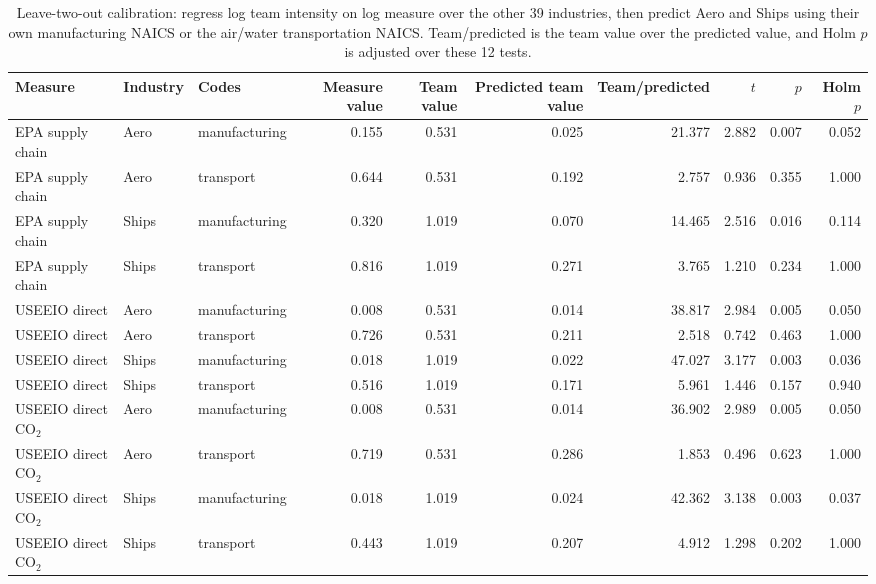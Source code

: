 \begin{table}[H]
\centering\small
\caption{Leave-two-out calibration: regress log team intensity on log measure over the other 39 industries, then predict Aero and Ships using their own manufacturing NAICS or the air/water transportation NAICS. Team/predicted is the team value over the predicted value, and Holm $p$ is adjusted over these 12 tests.}
\label{tab:m4_calibration}
\begin{adjustbox}{max width=\linewidth}
\begin{tabular}{lllrrrrrrr}
\toprule
Measure & Industry & Codes & Measure value & Team value & Predicted team value & Team/predicted & $t$ & $p$ & Holm $p$ \\
\midrule
EPA supply chain & Aero & manufacturing & 0.155 & 0.531 & 0.025 & 21.377 & 2.882 & 0.007 & 0.052 \\
EPA supply chain & Aero & transport & 0.644 & 0.531 & 0.192 & 2.757 & 0.936 & 0.355 & 1.000 \\
EPA supply chain & Ships & manufacturing & 0.320 & 1.019 & 0.070 & 14.465 & 2.516 & 0.016 & 0.114 \\
EPA supply chain & Ships & transport & 0.816 & 1.019 & 0.271 & 3.765 & 1.210 & 0.234 & 1.000 \\
USEEIO direct & Aero & manufacturing & 0.008 & 0.531 & 0.014 & 38.817 & 2.984 & 0.005 & 0.050 \\
USEEIO direct & Aero & transport & 0.726 & 0.531 & 0.211 & 2.518 & 0.742 & 0.463 & 1.000 \\
USEEIO direct & Ships & manufacturing & 0.018 & 1.019 & 0.022 & 47.027 & 3.177 & 0.003 & 0.036 \\
USEEIO direct & Ships & transport & 0.516 & 1.019 & 0.171 & 5.961 & 1.446 & 0.157 & 0.940 \\
USEEIO direct CO$_2$ & Aero & manufacturing & 0.008 & 0.531 & 0.014 & 36.902 & 2.989 & 0.005 & 0.050 \\
USEEIO direct CO$_2$ & Aero & transport & 0.719 & 0.531 & 0.286 & 1.853 & 0.496 & 0.623 & 1.000 \\
USEEIO direct CO$_2$ & Ships & manufacturing & 0.018 & 1.019 & 0.024 & 42.362 & 3.138 & 0.003 & 0.037 \\
USEEIO direct CO$_2$ & Ships & transport & 0.443 & 1.019 & 0.207 & 4.912 & 1.298 & 0.202 & 1.000 \\
\bottomrule
\end{tabular}
\end{adjustbox}
\end{table}
